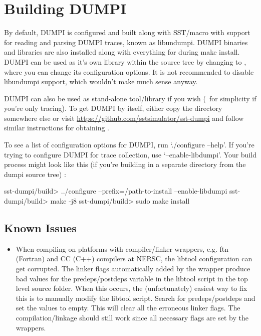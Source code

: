 \section{Building DUMPI}
\label{sec:building:dumpi}

By default, DUMPI is configured and built along with SST/macro with support for reading and parsing DUMPI traces, known as libundumpi.  
DUMPI binaries and libraries are also installed along with everything for \sstmacro during make install.   
DUMPI can be used as it's own library within the \sstmacro source tree by changing to , 
where you can change its configuration options.  
It is not recommended to disable libundumpi support, which wouldn't make much sense anyway. 

DUMPI can also be used as stand-alone tool/library if you wish (\eg~for simplicity if you're only tracing). 
To get DUMPI by itself, either copy the  directory somewhere else or visit \url{https://github.com/sstsimulator/sst-dumpi} and follow similar instructions for obtaining \sstmacro.

To see a list of configuration options for DUMPI, run `./configure --help'.  
If you're trying to configure DUMPI for trace collection, use `--enable-libdumpi'.
Your build process might look like this (if you're building in a separate directory from the dumpi source tree) :

\begin{ShellCmd}
sst-dumpi/build> ../configure --prefix=/path-to-install --enable-libdumpi
sst-dumpi/build> make -j8
sst-dumpi/build> sudo make install
\end{ShellCmd}

\subsection{Known Issues}
\label{subsubsec:building:dumpi:issues}

\begin{itemize}
\item When compiling on platforms with compiler/linker wrappers, e.g. ftn (Fortran) and CC (C++) compilers 
at NERSC, the libtool configuration can get corrupted.  The linker flags automatically added by the 
wrapper produce bad values for the predeps/postdeps variable in the libtool script in the top 
level source folder.  When this occurs, the (unfortunately) easiest way to fix this is to manually modify
the libtool script.  Search for predeps/postdeps and set the values to empty.
This will clear all the erroneous linker flags.  The compilation/linkage should still work since 
all necessary flags are set by the wrappers. 
\end{itemize}

